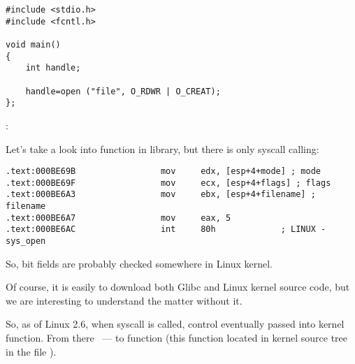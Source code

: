 
\begin{lstlisting}
#include <stdio.h>
#include <fcntl.h>

void main()
{
	int handle;

	handle=open ("file", O_RDWR | O_CREAT);
};
\end{lstlisting}

:



{Let's take a look into  function in  library, but there is only syscall calling:}

\begin{lstlisting}
.text:000BE69B                 mov     edx, [esp+4+mode] ; mode
.text:000BE69F                 mov     ecx, [esp+4+flags] ; flags
.text:000BE6A3                 mov     ebx, [esp+4+filename] ; filename
.text:000BE6A7                 mov     eax, 5
.text:000BE6AC                 int     80h             ; LINUX - sys_open
\end{lstlisting}

{So,  bit fields are probably checked somewhere in Linux kernel.}

{Of course, it is easily to download both Glibc and Linux kernel source code, 
but we are interesting to understand the matter without it.}

{So, as of Linux 2.6, when  syscall is called, control eventually passed into  kernel function.
From there ~--- to  function (this function located in kernel source tree in the file ).}

\newcommand{\URLREGPARM}{\url{http://ohse.de/uwe/articles/gcc-attributes.html\#func-regparm}}


